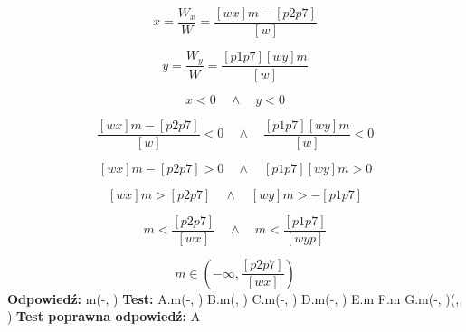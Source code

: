\documentclass[12pt, a4paper]{article}
\theoremstyle{definition} %
\newcommand{\rozwStop}{\newline}                                            %
\newcommand{\odpStart}{\noindent \textbf{Odpowiedź:}\newline}    %
\newcommand{\odpStop}{\newline}                                             %
\newcommand{\testStart}{\noindent \textbf{Test:}\newline} %
\newcommand{\testStop}{\newline} %
\newcommand{\kluczStart}{\noindent \textbf{Test poprawna odpowiedź:}\newline} %
\newcommand{\kluczStop}{\newline} %
\begin{document}
$$x=\frac{W_{x}}{W}=\frac{[wx]m-[p2p7]}{[w]}$$

$$y=\frac{W_{y}}{W}=\frac{[p1p7][wy]m}{[w]}$$

$$x<0 \quad \land \quad y<0$$

$$\frac{[wx]m-[p2p7]}{[w]}<0 \quad \land \quad  \frac{[p1p7][wy]m}{[w]}<0$$

$$[wx]m-[p2p7]>0 \quad \land \quad  [p1p7][wy]m>0$$

$$[wx]m>[p2p7] \quad \land \quad [wy]m>-[p1p7]$$

$$m<\frac{[p2p7]}{[wx]} \quad \land \quad m<\frac{[p1p7]}{[wyp]}$$

$$m\in\left(-\infty, \frac{[p2p7]}{[wx]}\right) $$
\rozwStop
\odpStart
m\in\left(-\infty, \frac{[p2p7]}{[wx]}\right)\odpStop
\testStart
A.m\in\left(-\infty, \frac{[p2p7]}{[wx]}\right)
B.m\in\left(\frac{[p2p7]}{[wx]}, \infty\right)
C.m\in\left(-\infty, \frac{[p1p7]}{[wyp]}\right)
D.m\in\left(-\infty, \frac{[p2p7]}{[w]}\right)
E.m\in\emptyset
F.m\in{}
G.m\in\left(-\infty, \frac{[p2p7]}{[wx]}\right)\cup \left(\frac{[p1p7]}{[wyp]}, \infty\right)
\testStop
\kluczStart
A
\kluczStop
\end{document}
